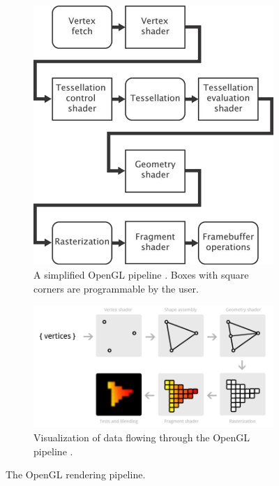 \documentclass{article}
\begin{document}
\begin{figure}[h]
    \centering
    \begin{subfigure}[h]{0.29\textwidth}
    	\includegraphics[width=\textwidth]{pipeline}
    	\caption{A simplified OpenGL pipeline \cite{sellers2016}. Boxes with square corners are programmable by the user.}
    	\label{fig:pipeline-flow}
    \end{subfigure}
    \begin{subfigure}[h]{0.49\textwidth}
	    \includegraphics[width=\textwidth]{pipeline-visualized}
	    \caption{Visualization of data flowing through the OpenGL pipeline \cite{overvoorde2019}.}
	    \label{fig:pipeline-visualized}
    \end{subfigure}
	\caption{The OpenGL rendering pipeline.}
	\label{fig:pipeline}
\end{figure}
\end{document}
